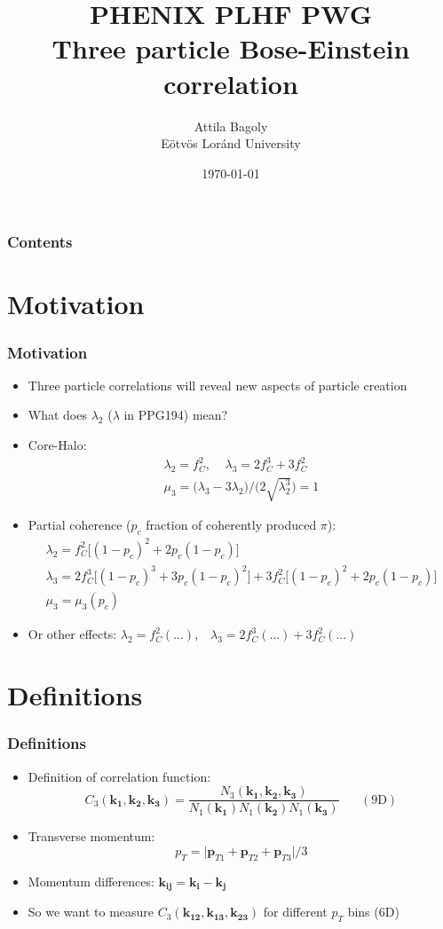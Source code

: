 \documentclass{beamer}
\title[HBT]{\Large{PHENIX PLHF PWG}\\Three particle Bose-Einstein correlation}
\author[Attila Bagoly]{Attila Bagoly\\ Eötvös Loránd University \vspace{0.5cm}}
\date[\today]{\today}
\institute[ELTE]{
\large{Supervisor: Máté Csanád}
}
\begin{document}
\begin{frame}
  \titlepage
\end{frame}

\begin{frame}
\frametitle{Contents}
\tableofcontents
\end{frame}


\section{Motivation}
\begin{frame}
\frametitle{Motivation}
\begin{itemize}
\setlength{\itemsep}{12pt}
\item Three particle correlations will reveal new aspects of particle creation
\item What does $\lambda_2$ ($\lambda$ in PPG194) mean?
\item Core-Halo: 
	\begin{align}
		\lambda_2=f_C^2,\;\;\;\;\lambda_3 = 2f_C^3+3f_C^2 \\ 
		\mu_3=\big(\lambda_3-3\lambda_2\big)/\big(2\sqrt{\lambda_2^3}\big)=1
	\end{align}
\item Partial coherence ($p_c$ fraction of coherently produced $\pi$): 
	\begin{gather}
		\lambda_2=f_C^2\big[(1-p_c)^2+2p_c(1-p_c)\big]\\
		\lambda_3=2f_C^3\big[(1-p_c)^3+3p_c(1-p_c)^2\big]+3f_C^2\big[(1-p_c)^2+2p_c(1-p_c)\big]\nonumber\\
		\mu_3 = \mu_3(p_c)
	\end{gather}
\item Or other effects: $\lambda_2 = f_C^2(...),\;\;\;\lambda_3 = 2f_C^3(...)+3f_C^2(...)$\end{itemize}
\end{frame}

\section{Definitions}
\begin{frame}
\frametitle{Definitions}
\begin{itemize}
\setlength{\itemsep}{12pt}
\item Definition of correlation function:
\begin{equation}
C_3(\bm{k_1}, \bm{k_2}, \bm{k_3})=\frac{N_3(\bm{k_1}, \bm{k_2}, \bm{k_3})}{N_1(\bm{k_1})N_1(\bm{k_2})N_1(\bm{k_3})}\;\;\;\;\;\; \mathrm{(9D)} \label{eq:e1}
\end{equation}
\item Transverse momentum:
\begin{equation}
p_T=\big|\bm{p}_{T1}+\bm{p}_{T2}+\bm{p}_{T3}\big|/3
\end{equation}
\item Momentum differences: $\bm{k_{ij}}=\bm{k_i}-\bm{k_j}$
\item So we want to measure $C_3(\bm{k_{12}}, \bm{k_{13}}, \bm{k_{23}})$ for different $p_T$ bins (6D)
\end{itemize}
\end{frame}
\end{document}
